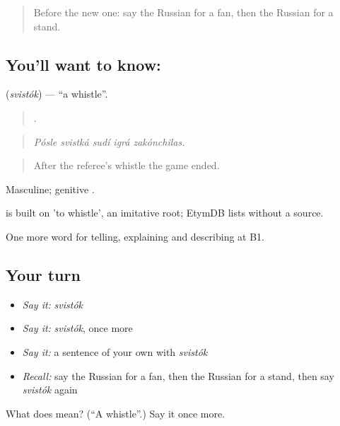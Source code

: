 \begin{quote}
Before the new one: say the Russian for a fan, then the Russian for a stand.
\end{quote}

\subsection*{You'll want to know: }
\textbf{} (\emph{svistók}) — \textquotedblleft{}a whistle\textquotedblright{}.

\begin{quote}
    .
\end{quote}

\begin{quote}
\emph{Pósle svistká sudí igrá zakónchilas.}
\end{quote}

\begin{quote}
After the referee's whistle the game ended.
\end{quote}

Masculine; genitive .

\begin{cousinweb}
\emph{} is built on \emph{} 'to whistle', an imitative root; EtymDB lists \emph{} without a source.
\end{cousinweb}

\begin{grammarlens}[title={What you've built}]
One more word for telling, explaining and describing at B1.
\end{grammarlens}

\subsection*{Your turn}
\begin{itemize}
\raggedright
  \item \emph{Say it:} \emph{svistók}
  \item \emph{Say it:} \emph{svistók}, once more
  \item \emph{Say it:} a sentence of your own with \emph{svistók}
  \item \emph{Recall:} say the Russian for a fan, then the Russian for a stand, then say \emph{svistók} again
\end{itemize}

\begin{tcolorbox}[breakable,colback=teal!4,colframe=teal!35!black,title={Before you move on}]
What does  mean? (\textquotedblleft{}A whistle\textquotedblright{}.) Say it once more.
\end{tcolorbox}
